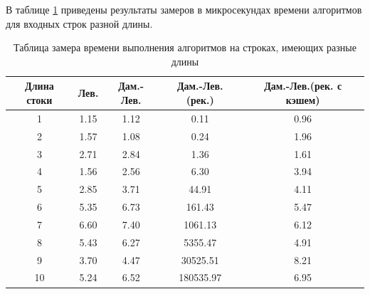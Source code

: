 \documentclass[a4paper,14pt, unknownkeysallowed]{extreport}
\begin{document}
В таблице \ref{table:t1} приведены результаты замеров в микросекундах времени алгоритмов для входных строк разной длины.
 
	\begin{table} [h!]
        \captionsetup{justification=raggedright,singlelinecheck=off}
		\caption{Таблица замера времени выполнения алгоритмов на строках, имеющих разные длины}
		\label{table:t1}
		\begin{center}
			\begin{tabular}{|c | c | c | c | c|}
				
				\hline
				
				Длина стоки & Лев. & Дам.-Лев. & Дам.-Лев.(рек.) &   Дам.-Лев.(рек. с кэшем)  \\ [0.5ex]
				
				\hline
				
				1 & 1.15 & 1.12 & 0.11 & 0.96 \\ 
				
				\hline 
				
				2 & 1.57 & 1.08 & 0.24 & 1.96 \\ 
				
				\hline 
				
				3 & 2.71 & 2.84 & 1.36 & 1.61 \\ 
				
				\hline 
				
				4 & 1.56 & 2.56 & 6.30 & 3.94 \\ 
				
				\hline 
				
				5 & 2.85 & 3.71 & 44.91 & 4.11 \\ 
				
				\hline 
				
				6 & 5.35 & 6.73 & 161.43 & 5.47 \\ 
				
				\hline 
				
				7 & 6.60 & 7.40 & 1061.13 & 6.12 \\ 
				
				\hline 
				
				8 & 5.43 & 6.27 & 5355.47 & 4.91 \\ 
				
				\hline 
				
				9 & 3.70 & 4.47 & 30525.51 & 8.21\\ 
				
				\hline 
				
				10 & 5.24 & 6.52 & 180535.97 & 6.95\\ 
				
				\hline 
			\end{tabular}
		\end{center}
	\end{table}
\end{document}
